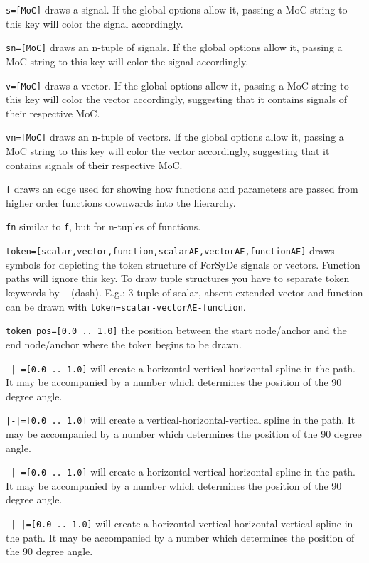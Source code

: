\documentclass[10pt]{article}
\newenvironment{optionslist}[0]{ 
\begin{list}{}{
	\setlength{\itemindent}{-10pt}
	\setlength{\itemsep}{0pt}
	\setlength{\parsep}{0pt}
}}{\end{list}}
\begin{document}
\begin{optionslist}
\item \texttt{s=[MoC]} draws a signal. If the global options allow it, passing a MoC string to this key will color the signal accordingly. 
\item \texttt{sn=[MoC]} draws an n-tuple of signals. If the global options allow it, passing a MoC string to this key will color the signal accordingly. 
\item \texttt{v=[MoC]} draws a vector. If the global options allow it, passing a MoC string to this key will color the vector accordingly, suggesting that it contains signals of their respective MoC.
\item \texttt{vn=[MoC]} draws an n-tuple of vectors. If the global options allow it, passing a MoC string to this key will color the vector accordingly, suggesting that it contains signals of their respective MoC.
\item \texttt{f} draws an edge used for showing how functions and parameters are passed from higher order functions downwards into the hierarchy.  
\item \texttt{fn} similar to \texttt{f}, but for n-tuples of functions.  
\item \texttt{token=[scalar,vector,function,scalarAE,vectorAE,functionAE]} draws symbols for depicting the token structure of ForSyDe signals or vectors. Function paths will ignore this key. To draw tuple structures you have to separate token keywords by \texttt{-} (dash). E.g.: 3-tuple of scalar, absent extended vector and function can be drawn with \texttt{token=scalar-vectorAE-function}.
\item \texttt{token pos=[0.0 .. 1.0]} the position between the start node/anchor and the end node/anchor where the token begins to be drawn.
\item \texttt{-|-=[0.0 .. 1.0]} will create a horizontal-vertical-horizontal spline in the path. It may be accompanied by a number which determines the position of the 90 degree angle.
\item \texttt{|-|=[0.0 .. 1.0]} will create a vertical-horizontal-vertical spline in the path. It may be accompanied by a number which determines the position of the 90 degree angle.
\item \texttt{-|-=[0.0 .. 1.0]} will create a horizontal-vertical-horizontal spline in the path. It may be accompanied by a number which determines the position of the 90 degree angle.
\item \texttt{-|-|=[0.0 .. 1.0]} will create a horizontal-vertical-horizontal-vertical spline in the path. It may be accompanied by a number which determines the position of the 90 degree angle.

\end{optionslist}
\end{document}
